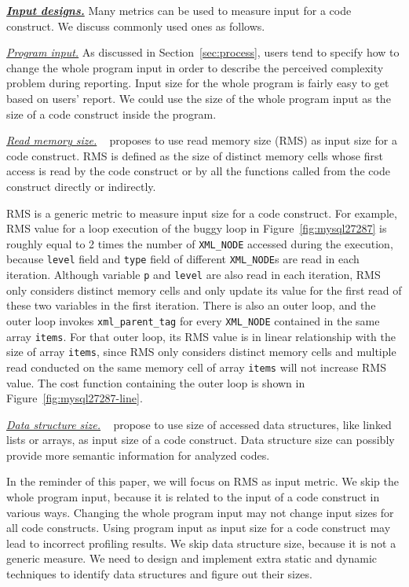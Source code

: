 {{\bf{\underline{\textit{Input designs.}}}}
Many metrics can be used to measure input for a code construct. 
We discuss commonly used ones as follows.



\underline{\textit{Program input.}}
As discussed in Section~\ref{sec:process}, 
users tend to specify how to change the whole program 
input in order to describe the perceived complexity problem during reporting.
Input size for the whole program is fairly easy to get based on users' report.
We could use the size of the whole program input 
as the size of a code construct inside the program.  

\underline{\textit{Read memory size.}}
~\citet{Aprof1,Aprof2} proposes to use read memory size (RMS) as
input size for a code construct. 
RMS is defined as the size of distinct memory cells 
whose first access is read by the code construct or by 
all the functions called from the code construct directly or indirectly.  


RMS is a generic metric to measure input size for a code construct. 
For example, 
RMS value for a loop execution of
the buggy loop in Figure~\ref{fig:mysql27287}
is roughly equal to 2 times the number of \texttt{XML\_NODE} 
accessed during the execution, 
because \texttt{level} field and \texttt{type} field of 
different \texttt{XML\_NODE}s are read in each iteration.
Although variable \texttt{p} and \texttt{level} are also read in each iteration,
RMS only considers distinct memory cells and 
only update its value for the first read of these two variables in the first iteration. 
There is also an outer loop, 
and the outer loop invokes \texttt{xml\_parent\_tag} 
for every \texttt{XML\_NODE} contained
in the same array \texttt{items}. 
For that outer loop, its RMS value is in linear relationship 
with the size of array \texttt{items}, 
since RMS only considers distinct memory cells 
and multiple read conducted on the same memory 
cell of array \texttt{items} will not increase RMS value. 
The cost function containing the outer loop is shown in Figure~\ref{fig:mysql27287-line}.


{\underline{\textit{Data structure size.}}}
~\citet{AlgoProf} propose to use size of accessed data structures, 
like linked lists or arrays, as input size of a code construct. 
Data structure size can possibly provide 
more semantic information for analyzed codes.
   
In the reminder of this paper, we will focus on RMS as input metric. 
We skip the whole program input, 
because it is related to the input of a code construct in various ways.
Changing the whole program input may not change input sizes for all code constructs. 
Using program input as input size for a code 
construct may lead to incorrect profiling results. 
We skip data structure size,
because it is not a generic measure. 
We need to design and implement extra static and dynamic techniques 
to identify data structures and figure out their sizes.



}

